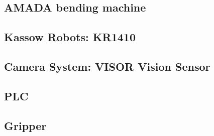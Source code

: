 \subsection{AMADA bending machine}
\label{subsec:amada}


\subsection{Kassow Robots: KR1410}
\label{subsec:kr1410}



\subsection{Camera System: VISOR\textsuperscript{\textregistered} Vision Sensor}
\label{sec:visor}



\subsection{PLC}
\label{subsec:PLC}



\subsection{Gripper}
\label{subsec:robotic-gripper}




